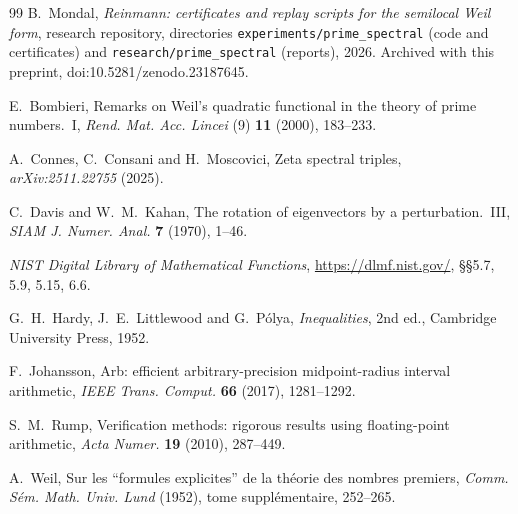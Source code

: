 \documentclass[11pt,a4paper]{article}
\theoremstyle{definition}
\begin{document}
\begin{thebibliography}{99}
B.~Mondal, \emph{Reinmann: certificates and replay scripts for the semilocal Weil form}, research repository, directories \texttt{experiments/prime\_spectral} (code and certificates) and \texttt{research/prime\_spectral} (reports), 2026. Archived with this preprint, doi:10.5281/zenodo.23187645.

E.~Bombieri, Remarks on Weil's quadratic functional in the theory of prime numbers.~I, \emph{Rend. Mat. Acc. Lincei} (9) \textbf{11} (2000), 183--233.

A.~Connes, C.~Consani and H.~Moscovici, Zeta spectral triples, \emph{arXiv:2511.22755} (2025).

C.~Davis and W.~M.~Kahan, The rotation of eigenvectors by a perturbation.~III, \emph{SIAM J. Numer. Anal.} \textbf{7} (1970), 1--46.

\emph{NIST Digital Library of Mathematical Functions}, \url{https://dlmf.nist.gov/}, \S\S5.7, 5.9, 5.15, 6.6.

G.~H.~Hardy, J.~E.~Littlewood and G.~P\'olya, \emph{Inequalities}, 2nd ed., Cambridge University Press, 1952.

F.~Johansson, Arb: efficient arbitrary-precision midpoint-radius interval arithmetic, \emph{IEEE Trans. Comput.} \textbf{66} (2017), 1281--1292.

S.~M.~Rump, Verification methods: rigorous results using floating-point arithmetic, \emph{Acta Numer.} \textbf{19} (2010), 287--449.

A.~Weil, Sur les ``formules explicites'' de la th\'eorie des nombres premiers, \emph{Comm. S\'em. Math. Univ. Lund} (1952), tome suppl\'ementaire, 252--265.
\end{thebibliography}
\end{document}
